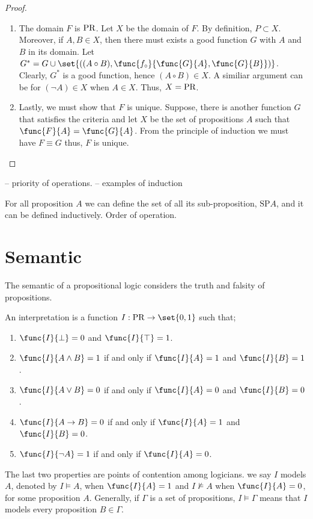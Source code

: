 \begin{proof}
\begin{enumerate}
        \item The domain \(F\) is \(\operatorname{PR}\). Let \(X\) be the domain of \(F\). By definition, \(P \subset X\). Moreover, if \(A,B \in X\), then there must exists a good function \(G\) with \(A\) and \(B\) in its domain. Let \(G^{\ast} = G \cup \set{((A \circ B), \func{f_{\circ}}{\func{G}{A}, \func{G}{B}})}\). Clearly, \(G^{\ast}\) is a good function, hence \((A \circ B) \in X\). A similiar argument can be for \((\neg A) \in X\) when \(A \in X\). Thus, \(X = \operatorname{PR}\).
        \item Lastly, we must show that \(F\) is unique.  Suppose, there is another function \(G\) that satisfies the criteria and let \(X\) be the set of propositions \(A\) such that \(\func{F}{A} = \func{G}{A}\). From the principle of induction we must have \(F \equiv G\) thus, \(F\) is unique.
    \end{enumerate}
\end{proof}
-- priority of operations.
-- examples of induction

For all proposition \(A\) we can define the set of all its sub-proposition, \(\mathrm{SP} {A}\), and it can be defined inductively. Order of operation.
\section{Semantic}
The semantic of a propositional logic considers the truth and falsity of propositions.
\begin{definition}
    An interpretation is a function \(I : \LPR \to \set{0,1}\) such that;
    \begin{enumerate}
        \item \(\func{I}{\perp} = 0 \) and \(\func{I}{\top} = 1\).
        \item \(\func{I}{A \land B} = 1\) if and only if \(\func{I}{A} = 1\) and \(\func{I}{B} = 1\).
        \item \(\func{I}{A \lor B} = 0\) if and only if \(\func{I}{A} = 0\) and \(\func{I}{B} = 0\).
        \item \(\func{I}{A \to B} = 0\) if and only if \(\func{I}{A} = 1\) and \(\func{I}{B} = 0\).
        \item \(\func{I}{\neg A} = 1\) if and only if \(\func{I}{A} = 0\).
    \end{enumerate}
    The last two properties are points of contention among logicians. we say \(I\) models \(A\), denoted by \(I \models A\), when \(\func{I}{A} = 1\) and \(I \not\models A\) when \(\func{I}{A} = 0\), for some proposition \(A\). Generally, if \(\Gamma\) is a set of propositions, \(I \models \Gamma\) means that \(I\) models every proposition \(B \in \Gamma\). 
\end{definition}


